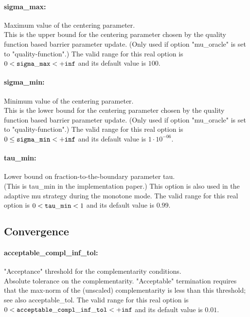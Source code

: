 \paragraph{sigma\_max:}\label{opt:sigma_max} Maximum value of the centering parameter. \\
 This is the upper bound for the centering parameter chosen by the quality function based barrier parameter update. (Only used if option "mu\_oracle" is set to "quality-function".) The valid range for this real option is 
$0 <  {\tt sigma\_max } <  {\tt +inf}$
and its default value is $100$.


\paragraph{sigma\_min:}\label{opt:sigma_min} Minimum value of the centering parameter. \\
 This is the lower bound for the centering parameter chosen by the quality function based barrier parameter update. (Only used if option "mu\_oracle" is set to "quality-function".) The valid range for this real option is 
$0 \le {\tt sigma\_min } <  {\tt +inf}$
and its default value is $1 \cdot 10^{-06}$.


\paragraph{tau\_min:}\label{opt:tau_min} Lower bound on fraction-to-the-boundary parameter tau. \\
 (This is tau\_min in the implementation paper.)  This option is also used in the adaptive mu strategy during the monotone mode. The valid range for this real option is 
$0 <  {\tt tau\_min } <  1$
and its default value is $0.99$.


\subsection{Convergence}
\label{sec:Convergence}
\paragraph{acceptable\_compl\_inf\_tol:}\label{opt:acceptable_compl_inf_tol} "Acceptance" threshold for the complementarity conditions. \\
 Absolute tolerance on the complementarity. "Acceptable" termination requires that the max-norm of the (unscaled) complementarity is less than this threshold; see also acceptable\_tol. The valid range for this real option is 
$0 <  {\tt acceptable\_compl\_inf\_tol } <  {\tt +inf}$
and its default value is $0.01$.


